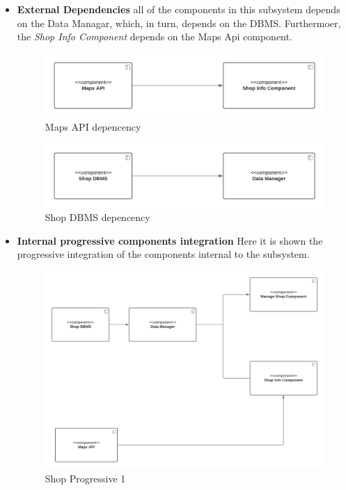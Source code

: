 \begin{itemize}
    \item \textbf{External Dependencies}
    all of the components in this subsystem depends on the Data Managar, which, in turn, depends on the DBMS. Furthermoer, the \textit{Shop Info Component}  depends on the Maps Api component.
    \begin{figure}[h!]
        \centering
        \includegraphics[width=.8\textwidth]{Images/TestDiagram/Shop/maps.png}
        \caption{\label{fig:ShopExternalDepMAPS}{Maps API depencency}}
    \end{figure}
    \FloatBarrier  
    
    \begin{figure}[h!]
        \centering
        \includegraphics[width=.8\textwidth]{Images/TestDiagram/Shop/data.png}
        \caption{\label{fig:ShopExternalDepDBMS}{Shop DBMS depencency}}
    \end{figure}
    \FloatBarrier
    \item \textbf{Internal progressive components integration} 
    Here it is shown the progressive integration of the components internal to the subsystem.
    \begin{figure}[h!]
        \centering
        \includegraphics[width=1\textwidth]{Images/TestDiagram/Shop/2Shop(1).png}
        \caption{\label{fig:Shopinternal}{Shop Progressive 1}}
    \end{figure}
    \FloatBarrier  
\end{itemize}

